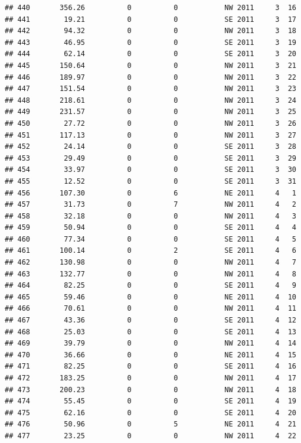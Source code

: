 \documentclass[
]{article}
\begin{document}
\begin{verbatim}
## 440       356.26          0          0           NW 2011     3  16
## 441        19.21          0          0           SE 2011     3  17
## 442        94.32          0          0           NW 2011     3  18
## 443        46.95          0          0           SE 2011     3  19
## 444        62.14          0          0           SE 2011     3  20
## 445       150.64          0          0           NW 2011     3  21
## 446       189.97          0          0           NW 2011     3  22
## 447       151.54          0          0           NW 2011     3  23
## 448       218.61          0          0           NW 2011     3  24
## 449       231.57          0          0           NW 2011     3  25
## 450        27.72          0          0           NW 2011     3  26
## 451       117.13          0          0           NW 2011     3  27
## 452        24.14          0          0           SE 2011     3  28
## 453        29.49          0          0           SE 2011     3  29
## 454        33.97          0          0           SE 2011     3  30
## 455        12.52          0          0           SE 2011     3  31
## 456       107.30          0          6           NE 2011     4   1
## 457        31.73          0          7           NW 2011     4   2
## 458        32.18          0          0           NW 2011     4   3
## 459        50.94          0          0           SE 2011     4   4
## 460        77.34          0          0           SE 2011     4   5
## 461       100.14          0          2           SE 2011     4   6
## 462       130.98          0          0           NW 2011     4   7
## 463       132.77          0          0           NW 2011     4   8
## 464        82.25          0          0           SE 2011     4   9
## 465        59.46          0          0           NE 2011     4  10
## 466        70.61          0          0           NW 2011     4  11
## 467        43.36          0          0           SE 2011     4  12
## 468        25.03          0          0           SE 2011     4  13
## 469        39.79          0          0           NW 2011     4  14
## 470        36.66          0          0           NE 2011     4  15
## 471        82.25          0          0           SE 2011     4  16
## 472       183.25          0          0           NW 2011     4  17
## 473       200.23          0          0           NW 2011     4  18
## 474        55.45          0          0           SE 2011     4  19
## 475        62.16          0          0           SE 2011     4  20
## 476        50.96          0          5           NE 2011     4  21
## 477        23.25          0          0           NW 2011     4  22

\end{verbatim}
\end{document}
